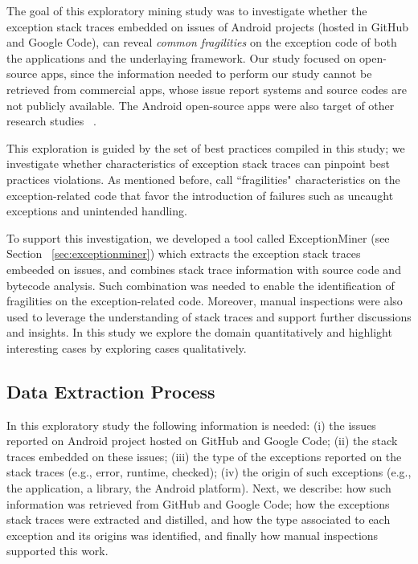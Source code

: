 \documentclass[conference]{IEEEtran}
\begin{document}
The goal of this exploratory mining study was to investigate whether the exception stack traces 
embedded on issues of Android projects (hosted in GitHub and Google Code), can reveal 
\emph{common fragilities} on the exception code of both the applications and the underlaying  framework. 
Our study focused on open-source apps, since the information needed to perform our study
cannot be retrieved from commercial apps, whose issue report systems and 
source codes are not publicly available. The Android open-source apps were also 
target of other research studies ~\cite{Linar13,ahimed}.   

This exploration is guided by the set of best practices compiled in this study; we investigate whether characteristics 
of exception stack traces can pinpoint best practices violations. As mentioned before, 
call ``fragilities" characteristics on the exception-related code that favor the introduction
of failures such as uncaught exceptions and unintended handling. 

To support this investigation, we developed a tool called ExceptionMiner (see Section ~\ref{sec:exceptionminer})
which extracts the exception stack traces embeeded on issues, 
and combines stack trace information with source code and bytecode 
analysis. Such combination was needed to enable the identification of 
fragilities on the exception-related code.
Moreover, manual inspections were also used to leverage
 the understanding of stack traces and support further discussions and insights.
In this study we explore the domain quantitatively and highlight interesting cases by 
exploring cases qualitatively.  

\subsection{Data Extraction Process}
\label{sec:miningproc}

In this exploratory study the following information is needed: (i) the issues reported on Android project hosted on 
GitHub and Google Code; (ii) the stack traces embedded on these issues; (iii) the type of the exceptions
 reported on the stack traces (e.g., error, runtime, checked); (iv) the origin of such exceptions 
(e.g., the application, a library, the Android platform). Next, we describe: how such information 
was retrieved from GitHub and Google Code; how the exceptions stack traces were extracted and distilled,
 and how the type associated to each exception and its origins was identified, and finally how manual
inspections supported this work.
\end{document}
